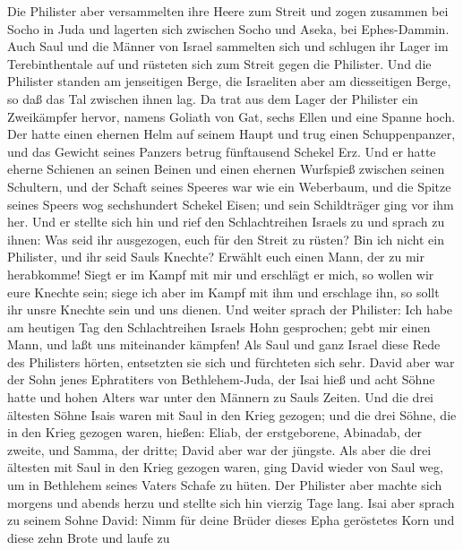  Die Philister aber versammelten ihre Heere zum Streit und
zogen zusammen bei Socho in Juda und lagerten sich zwischen Socho und
Aseka, bei Ephes-Dammin.  Auch Saul und die Männer von
Israel sammelten sich und schlugen ihr Lager im Terebinthentale auf und
rüsteten sich zum Streit gegen die Philister.  Und die
Philister standen am jenseitigen Berge, die Israeliten aber am
diesseitigen Berge, so daß das Tal zwischen ihnen lag.  Da
trat aus dem Lager der Philister ein Zweikämpfer hervor, namens Goliath
von Gat, sechs Ellen und eine Spanne hoch.  Der hatte
einen ehernen Helm auf seinem Haupt und trug einen Schuppenpanzer, und
das Gewicht seines Panzers betrug fünftausend Schekel Erz.
 Und er hatte eherne Schienen an seinen Beinen und einen
ehernen Wurfspieß zwischen seinen Schultern,  und der
Schaft seines Speeres war wie ein Weberbaum, und die Spitze seines
Speers wog sechshundert Schekel Eisen; und sein Schildträger ging vor
ihm her.  Und er stellte sich hin und rief den
Schlachtreihen Israels zu und sprach zu ihnen: Was seid ihr ausgezogen,
euch für den Streit zu rüsten? Bin ich nicht ein Philister, und ihr seid
Sauls Knechte? Erwählt euch einen Mann, der zu mir herabkomme!
 Siegt er im Kampf mit mir und erschlägt er mich, so
wollen wir eure Knechte sein; siege ich aber im Kampf mit ihm und
erschlage ihn, so sollt ihr unsre Knechte sein und uns dienen.
 Und weiter sprach der Philister: Ich habe am heutigen
Tag den Schlachtreihen Israels Hohn gesprochen; gebt mir einen Mann, und
laßt uns miteinander kämpfen!  Als Saul und ganz Israel
diese Rede des Philisters hörten, entsetzten sie sich und fürchteten
sich sehr.  David aber war der Sohn jenes Ephratiters von
Bethlehem-Juda, der Isai hieß und acht Söhne hatte und hohen Alters war
unter den Männern zu Sauls Zeiten.  Und die drei ältesten
Söhne Isais waren mit Saul in den Krieg gezogen; und die drei Söhne, die
in den Krieg gezogen waren, hießen: Eliab, der erstgeborene, Abinadab,
der zweite, und Samma, der dritte;  David aber war der
jüngste. Als aber die drei ältesten mit Saul in den Krieg gezogen waren,
 ging David wieder von Saul weg, um in Bethlehem seines
Vaters Schafe zu hüten.  Der Philister aber machte sich
morgens und abends herzu und stellte sich hin vierzig Tage lang.
 Isai aber sprach zu seinem Sohne David: Nimm für deine
Brüder dieses Epha geröstetes Korn und diese zehn Brote und laufe zu
